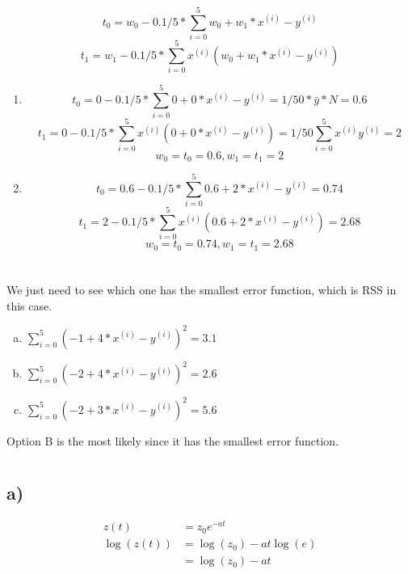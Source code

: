 \documentclass[11pt]{article}
\begin{document}
\section{}
\[ t_0 = w_0 - 0.1 / 5 * \sum\limits_{i=0}^{5} w_0 + w_1*x^{(i)} - y^{(i)} \]
\[ t_1 = w_1 - 0.1 /5 *  \sum\limits_{i=0}^{5} x^{(i)} \left(w_0 + w_1*x^{(i)} - y^{(i)}\right) \]
\begin{enumerate}
	\item 
	\[ t_0 = 0 - 0.1 / 5 * \sum\limits_{i=0}^{5} 0 +0*x^{(i)} - y^{(i)} = 1/50 * \bar{y}*N = 0.6  \]
	\[ t_1 = 0 - 0.1 /5 *  \sum\limits_{i=0}^{5} x^{(i)} \left(0 + 0*x^{(i)} - y^{(i)}\right) = 1/50 \sum\limits_{i=0}^{5} x^{(i)}y^{(i)} = 2\]
	\[ w_0 = t_0 = 0.6, w_1 = t_1 = 2\]
	
	\item 
	\[ t_0 = 0.6 - 0.1 / 5 * \sum\limits_{i=0}^{5} 0.6 + 2*x^{(i)} - y^{(i)} = 0.74\]
	\[ t_1 = 2 - 0.1 /5 *  \sum\limits_{i=0}^{5} x^{(i)} \left(0.6 + 2*x^{(i)} - y^{(i)}\right) =2.68\]
	\[ w_0 = t_0 = 0.74, w_1 = t_1 = 2.68\]
\end{enumerate}
\newpage

\section{}
We just need to see which one has the smallest error function, which is RSS in this case.
\begin{enumerate}[a)]
	\item $\sum\limits_{i=0}^{5} \left(-1 + 4*x^{(i)} - y^{(i)}\right)^2 = 3.1$
	\item $\sum\limits_{i=0}^{5} \left(-2 + 4*x^{(i)} - y^{(i)}\right)^2 = 2.6$
	\item $\sum\limits_{i=0}^{5} \left(-2 + 3*x^{(i)} - y^{(i)}\right)^2 = 5.6$
\end{enumerate}
Option B is the most likely since it has the smallest error function.
\newpage

\section{}
\subsection{a)}
\begin{align*}
	z(t) &= z_0 e^{-at}\\
	\log{(z(t))} &= \log{(z_0)} - at \log{(e)}\\
	&= \boxed{\log{(z_0)} - at}
\end{align*}
\end{document}
